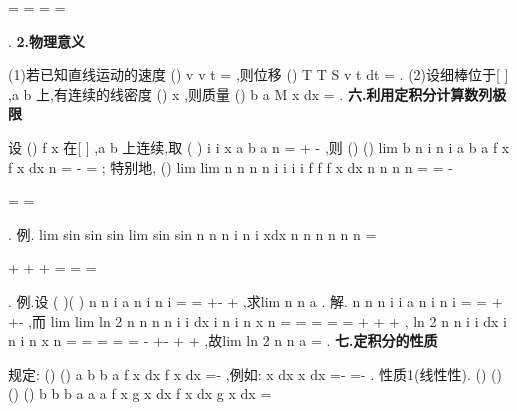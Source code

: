 =
=
=
=




\int 
\int 
\int 
. 
{\bfseries \textcolor{lyred}{2.物理意义}}

(1)若已知直线运动的速度
()
v
v t
=
,则位移
()
T
T
S
v t dt
=\int 
. 
(2)设细棒位于[
]
,a b 上,有连续的线密度
()
x
\rho 
,则质量
()
b
a
M
x dx
\rho 
=\int 
. 
\vspace{4pt}
{\bfseries \textcolor{lyred}{六.利用定积分计算数列极限}}

设
()
f x 在[
]
,a b 上连续,取
(
)
i
i
x
a
b
a
n
=
+
-
,则
()
()
lim
b
n
i
n
i
a
b
a
f x
f x dx
n
\to \infty 
=
-
=
\sum 
\int 
; 
特别地,
()
lim
lim
n
n
n
n
i
i
i
i
f
f
f x dx
n
n
n
n
\to \infty 
\to \infty 
=
=
-




=
=








\sum 
\sum 
\int 
. 
\textcolor{lyred}{例}.
lim
sin
sin
sin
lim
sin
sin
n
n
n
i
n
i
xdx
n
n
n
n
n
n
\pi 
\pi 
\pi 
\pi 
\pi 
\pi 
\to \infty 
\to \infty 
=


+
+
+
=
=
=




\sum 
\int 
\Lambda 
. 
\textcolor{lyred}{例}.设
(
)(
)
n
n
i
a
n
i
n
i
=
=
+-
+
\sum 
,求lim
n
n
a
\to \infty 
.\textcolor{lyred}{ }
解.
n
n
n
i
i
a
n
i
n
i
=
=
\le 
\le 
+
+-
\sum 
\sum 
,而
lim
lim
ln 2
n
n
n
n
i
i
dx
i
n
i
n
x
n
\to \infty 
\to \infty 
=
=
=
=
=
+
+
+
\sum 
\sum 
\int 
, 
ln 2
n
n
i
i
dx
i
n
i
n
x
n
=
=
=
=
=
-
+-
+
+
\sum 
\sum 
\int 
,故lim
ln 2
n
n
a
\to \infty 
=
. 
\vspace{4pt}
{\bfseries \textcolor{lyred}{七.定积分的性质}}

\textcolor{lyred}{规定}:
()
()
a
b
b
a
f x dx
f x dx
=-
\int 
\int 
,例如:
x dx
x dx
=-
=-
\int 
\int 
. 
\textcolor{lyred}{性质1(线性性)}.
()
()
()
()
b
b
b
a
a
a
f x
g x
dx
f x dx
g x dx
\alpha 
\beta 
\alpha 
\beta 
\pm 
=
\pm 




